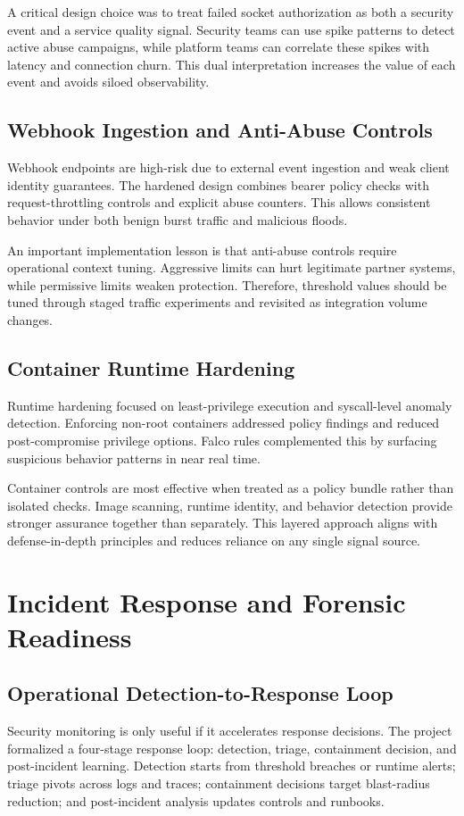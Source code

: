 \documentclass[conference]{IEEEtran}
\begin{document}
A critical design choice was to treat failed socket authorization as both a security event and a service quality signal. Security teams can use spike patterns to detect active abuse campaigns, while platform teams can correlate these spikes with latency and connection churn. This dual interpretation increases the value of each event and avoids siloed observability.

\subsection{Webhook Ingestion and Anti-Abuse Controls}
Webhook endpoints are high-risk due to external event ingestion and weak client identity guarantees. The hardened design combines bearer policy checks with request-throttling controls and explicit abuse counters. This allows consistent behavior under both benign burst traffic and malicious floods.

An important implementation lesson is that anti-abuse controls require operational context tuning. Aggressive limits can hurt legitimate partner systems, while permissive limits weaken protection. Therefore, threshold values should be tuned through staged traffic experiments and revisited as integration volume changes.

\subsection{Container Runtime Hardening}
Runtime hardening focused on least-privilege execution and syscall-level anomaly detection. Enforcing non-root containers addressed policy findings and reduced post-compromise privilege options. Falco rules complemented this by surfacing suspicious behavior patterns in near real time.

Container controls are most effective when treated as a policy bundle rather than isolated checks. Image scanning, runtime identity, and behavior detection provide stronger assurance together than separately. This layered approach aligns with defense-in-depth principles and reduces reliance on any single signal source.

\section{Incident Response and Forensic Readiness}
\subsection{Operational Detection-to-Response Loop}
Security monitoring is only useful if it accelerates response decisions. The project formalized a four-stage response loop: detection, triage, containment decision, and post-incident learning. Detection starts from threshold breaches or runtime alerts; triage pivots across logs and traces; containment decisions target blast-radius reduction; and post-incident analysis updates controls and runbooks.
\end{document}
